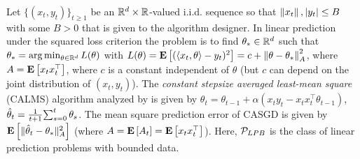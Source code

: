 \begin{example}
\label{ex:linpred}
Let $\{(x_t,y_t)\}_{t\ge 1}$ be an $\R^{d}\times \R$-valued i.i.d. sequence so that $\norm{x_t},|y_t|\le B$ with some $B>0$ that is given to the algorithm designer.
In linear prediction under the squared loss criterion the problem is to find $\ts\in \R^d$ such that 
$\ts = \arg\min_{\theta\in \R^d} L(\theta)$ with $L(\theta)= \EE{ (\ip{x_t,\theta}-y_t)^2 } =c + \norm{\theta-\ts}_{A}^2$, where $A = \EE{x_t x_t^\top}$, where $c$ is a constant independent of $\theta$ (but $c$ can depend on the joint distribution of $(x_t,y_t)$).
The \emph{constant stepsize averaged least-mean square} (CALMS) algorithm analyzed by \citet{bach-moulines} is given by 
$\theta_t=\theta_{t-1}+\alpha(x_t y_t-x_tx_t^\top\theta_{t-1})$,
$\thh_t=\frac{1}{t+1}{\sum}_{s=0}^{t}\,\theta_s$. 
The mean square prediction error of CASGD is given by $\EE{\normsm{\thh_t-\ts}^2_A}$ (where $A=\EE{A_t}=\EE{x_tx_t^\top}$). Here, $\P_{LPB}$ is the class of linear prediction problems with bounded data.
\fi
\end{example}
\begin{comment}
\begin{table}[H]
\resizebox{\columnwidth}{!}{
\begin{tabular}{|c|c|}\hline
TD(0)& GTD\\ \hline
$\begin{aligned}\label{eq:td}
\quad\delta_t &= r_t+(\gamma \phi'_t-\phi_t)^\top \theta_t,\\
\quad\theta_{t+1}&= \theta_t+\alpha \rho_t\phi_t (\delta_t),\\
\quad\thh_{t} &= \frac{1}{t+1}\sum_{s=0}^t \theta_s
\end{aligned}
$ & $\begin{aligned}\label{eq:gtd}
\quad\Delta_t&=\phi_t(\gamma \phi'_t-\phi_t)^\top,\\
y_{t+1}&=y_t+\beta\rho_t(\phi_t r_t+\Delta_t\theta_t -y_t),\\
\theta_{t+1}&=\theta_t+\alpha\Delta_t^\top y_{t+1}\\
\thh_{t}&=\frac{1}{t+1}\sum_{s=0}^t \theta_s, \hat{y}_{t}=\frac{1}{t+1}\sum_{s=0}^t y_s, 
\end{aligned}
$ \\\hline
\end{tabular}
}
\caption{Shows the TD(0) and GTD algorithms. In this paper, we let $\beta=\alpha$ in GTD. It is straightforward to write down appropriate $A_t$ and $b_t$ for the two algorithms, and we leave it as an exercise. 
}
\label{tb:tdalgos}
\end{table}
\end{comment}




